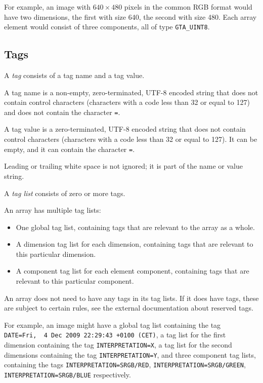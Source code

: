 \documentclass[a4paper,11pt]{article}
\newcommand{\code}[1]{\texttt{#1}}
\begin{document}
For example, an image with $640\times 480$ pixels in the common RGB format
would have two dimensions, the first with size 640, the second with size 480.
Each array element would consist of three components, all of type
\code{GTA\_UINT8}.


\subsection{Tags}
\label{sec:tags}

A \emph{tag} consists of a tag name and a tag value.

A tag name is a non-empty, zero-terminated, \mbox{UTF-8} encoded string that does not
contain control characters (characters with a code less than 32 or equal to 127)
and does not contain the character \code{=}.

A tag value is a zero-terminated, \mbox{UTF-8} encoded string that does not contain
control characters (characters with a code less than 32 or equal to 127). It can
be empty, and it can contain the character \code{=}.

Leading or trailing white space is not ignored; it is part of the name or
value string.

A \emph{tag list} consists of zero or more tags.

An array has multiple tag lists:
\begin{itemize}
\item One global tag list, containing tags that are relevant to the array as a
whole.
\item A dimension tag list for each dimension, containing tags that are
relevant to this particular dimension.
\item A component tag list for each element component, containing tags that
are relevant to this particular component.
\end{itemize}

An array does not need to have any tags in its tag lists. If it does have
tags, these are subject to certain rules, see the external documentation about
reserved tags.

For example, an image might have a global tag list containing the tag\linebreak
\code{DATE=Fri,~~4~Dec~2009 22:29:43 +0100 (CET)}, 
a tag list for the first dimension containing the tag \code{INTERPRETATION=X},
a tag list for the second dimensions containing the tag
\code{INTERPRETATION=Y}, and three component tag lists, containing the tags
\code{INTERPRETATION=SRGB/RED}, \code{INTERPRETATION=SRGB/GREEN},\linebreak
\code{INTERPRETATION=SRGB/BLUE} respectively.
\end{document}
